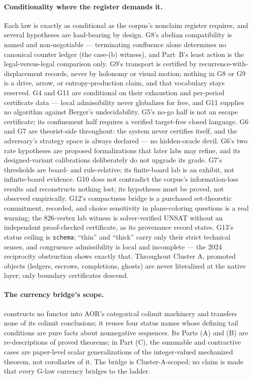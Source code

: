 \documentclass[11pt]{article}
\theoremstyle{definition}
\begin{document}
\paragraph{Conditionality where the register demands it.} Each law is exactly as conditional as the
corpus's nonclaim register requires, and several hypotheses are load-bearing by design. G8's abelian
compatibility is named and non-negotiable --- terminating confluence alone determines no canonical
counter ledger (the case-(b) witness), and Part~B's least action is the legal-versus-legal
comparison only. G9's transport is certified by recurrence-with-displacement records, never by
holonomy or visual motion; nothing in G8 or G9 is a drive, arrow, or entropy-production claim, and
that vocabulary stays reserved. G4 and G11 are conditional on their exhaustion and per-period
certificate data --- local admissibility never globalizes for free, and G11 supplies no algorithm
against Berger's undecidability. G5's no-go half is not an escape certificate; its confinement half
requires a verified target-free closed language. G6 and G7 are theorist-side throughout: the system
never certifies itself, and the adversary's strategy space is always declared --- no hidden-oracle
devil. G6's two rate hypotheses are proposed formalizations that later labs may refine, and its
designed-variant calibrations deliberately do not upgrade its grade. G7's thresholds are board- and
rule-relative; its finite-board lab is an exhibit, not infinite-board evidence. G10 does not
contradict the corpus's information-loss results and reconstructs nothing lost; its hypotheses must
be proved, not observed empirically. G12's compactness bridge is a purchased set-theoretic
commitment, recorded, and choice sensitivity in plane-coloring questions is a real warning; the
826-vertex lab witness is solver-verified UNSAT without an independent proof-checked certificate,
as its provenance record states. G13's status ceiling is \texttt{schema}; ``thin'' and ``thick''
carry only their strict technical senses, and congruence admissibility is local and incomplete ---
the 2024 reciprocity obstruction shows exactly that. Throughout Cluster A, promoted objects
(ledgers, escrows, completions, ghosts) are never literalized at the native layer; only boundary
certificates descend.

\paragraph{The currency bridge's scope.}  constructs no functor into
AOR's categorical colimit machinery and transfers none of its colimit conclusions; it reuses four
status names whose defining tail conditions are pure facts about nonnegative sequences. Its Parts
(A) and (B) are re-descriptions of proved theorems; in Part (C), the summable and contractive cases
are paper-level scalar generalizations of the integer-valued mechanized theorem, not corollaries of
it. The bridge is Cluster-A-scoped; no claim is made that every G-law currency bridges to the
ladder.
\end{document}
